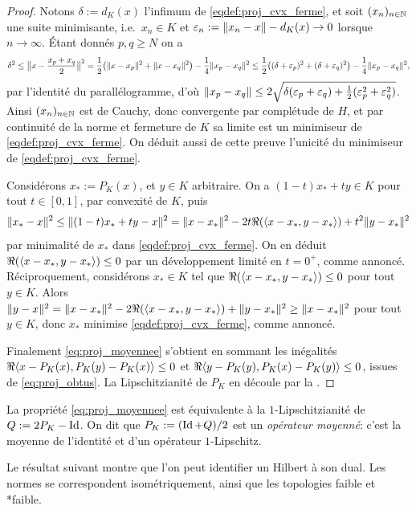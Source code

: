 \begin{proof}
Notons $\delta:=d_K(x)$ l'infimum de \eqref{eqdef:proj_cvx_ferme}, et 
soit $(x_n)_{n \in \mathbb{N}}$ une suite minimisante, i.e.\ $x_n\in K$ et $\varepsilon_n := \|x_n - x\|-d_K(x) \to 0$ lorsque $n \to \infty$.
Étant donnés $p,q \geq N$ on a 
\begin{equation*}
	\delta^2 \leq \big\| x - \frac{x_p+x_q} 2\big\|^2 
	= \frac 1 2 \big(\|x-x_p\|^2 + \|x-x_q\|^2\big) - \frac 1 4\|x_p-x_q\|^2
	\leq \frac 1 2 \big((\delta+\varepsilon_p)^2 + (\delta+\varepsilon_q)^2\big)	- \frac 1 4\|x_p-x_q\|^2,
\end{equation*}
par l'identité du parallélogramme, d'où $\|x_p-x_q\| \leq 2\sqrt{\delta(\varepsilon_p+\varepsilon_q)+ \frac 1 2 (\varepsilon_p^2+\varepsilon_q^2)}$. Ainsi $(x_n)_{n \in \mathbb{N}}$ est de Cauchy, donc convergente par complétude de $H$, et par continuité de la norme et fermeture de $K$ sa limite est un minimiseur de \eqref{eqdef:proj_cvx_ferme}.
On déduit aussi de cette preuve l'unicité du minimiseur de \eqref{eqdef:proj_cvx_ferme}.

Considérons $x_* := P_K(x)$, et $y\in K$ arbitraire. On a $(1-t) x_*+ ty \in K$ pour tout $t \in [0,1]$, par convexité de $K$, puis
\begin{equation}
\label{eq:caract_proj_proof}
	\|x_*-x\|^2 \leq \|(1-t) x_* + t y - x\|^2 = \|x-x_*\|^2 - 2 t \Re(\langle x-x_*,y-x_*\rangle) + t^2 \|y-x_*\|^2
\end{equation}
par minimalité de $x_*$ dans \eqref{eqdef:proj_cvx_ferme}. On en déduit $\Re(\langle x-x_*,y-x_*\rangle)\leq 0$ par un développement limité en $t=0^+$, comme annoncé. 
Réciproquement, considérons $x_* \in K$ tel que $\Re(\langle x-x_*,y-x_*\rangle)\leq 0$ pour tout $y \in K$.
Alors $\|y-x\|^2 = \|x-x_*\|^2 - 2 \Re(\langle x-x_*,y-x_*\rangle) + \|y-x_*\|^2 \geq \|x-x_*\|^2$ pour tout $y \in K$, donc $x_*$ minimise \eqref{eqdef:proj_cvx_ferme}, comme annoncé.

Finalement \eqref{eq:proj_moyennee} s'obtient en sommant les inégalités $\Re\langle x-P_K(x), P_K(y)-P_K(x)\rangle \leq 0$ et $\Re\langle y-P_K(y), P_K(x)-P_K(y)\rangle \leq 0$, issues de \eqref{eq:proj_obtus}. La Lipschitzianité de $P_K$ en découle par la .
\end{proof}

La propriété \eqref{eq:proj_moyennee} est équivalente à la $1$-Lipschitzianité de $Q := 2P_K-\operatorname{Id}$. On dit que $P_K := (\operatorname{Id}+Q)/2$ est un \emph{opérateur moyenné}: c'est la moyenne de l'identité et d'un opérateur $1$-Lipschitz.


Le résultat suivant montre que l'on peut identifier un Hilbert à son dual. Les normes se correspondent isométri\-quement, ainsi que les topologies faible et *faible. 

